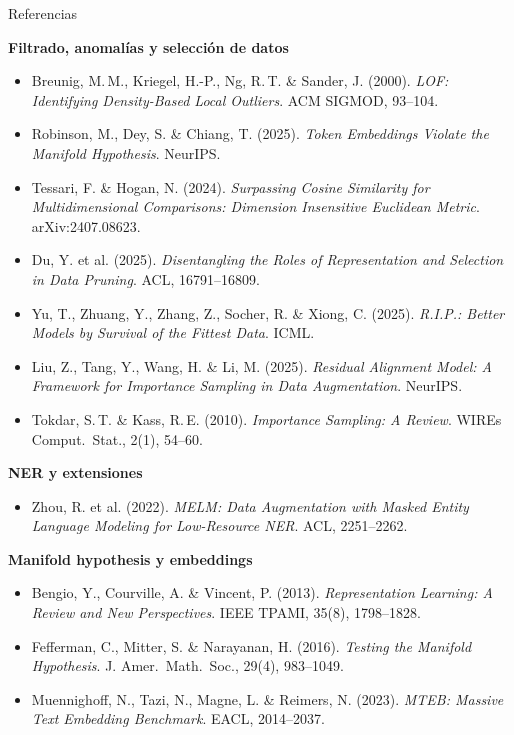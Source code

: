 \begin{frame}[allowframebreaks]{Referencias}
\framebreak

\textbf{Filtrado, anomalías y selección de datos}
\begin{itemize}\setlength\itemsep{0pt}
  \item Breunig, M.\,M., Kriegel, H.-P., Ng, R.\,T. \& Sander, J. (2000). \textit{LOF: Identifying Density-Based Local Outliers}. ACM SIGMOD, 93--104.
  \item Robinson, M., Dey, S. \& Chiang, T. (2025). \textit{Token Embeddings Violate the Manifold Hypothesis}. NeurIPS.
  \item Tessari, F. \& Hogan, N. (2024). \textit{Surpassing Cosine Similarity for Multidimensional Comparisons: Dimension Insensitive Euclidean Metric}. arXiv:2407.08623.
  \item Du, Y. et al. (2025). \textit{Disentangling the Roles of Representation and Selection in Data Pruning}. ACL, 16791--16809.
  \item Yu, T., Zhuang, Y., Zhang, Z., Socher, R. \& Xiong, C. (2025). \textit{R.I.P.: Better Models by Survival of the Fittest Data}. ICML.
  \item Liu, Z., Tang, Y., Wang, H. \& Li, M. (2025). \textit{Residual Alignment Model: A Framework for Importance Sampling in Data Augmentation}. NeurIPS.
  \item Tokdar, S.\,T. \& Kass, R.\,E. (2010). \textit{Importance Sampling: A Review}. WIREs Comput.\ Stat., 2(1), 54--60.
\end{itemize}

\textbf{NER y extensiones}
\begin{itemize}\setlength\itemsep{0pt}
  \item Zhou, R. et al. (2022). \textit{MELM: Data Augmentation with Masked Entity Language Modeling for Low-Resource NER}. ACL, 2251--2262.
\end{itemize}

\textbf{Manifold hypothesis y embeddings}
\begin{itemize}\setlength\itemsep{0pt}
  \item Bengio, Y., Courville, A. \& Vincent, P. (2013). \textit{Representation Learning: A Review and New Perspectives}. IEEE TPAMI, 35(8), 1798--1828.
  \item Fefferman, C., Mitter, S. \& Narayanan, H. (2016). \textit{Testing the Manifold Hypothesis}. J. Amer.\ Math.\ Soc., 29(4), 983--1049.
  \item Muennighoff, N., Tazi, N., Magne, L. \& Reimers, N. (2023). \textit{MTEB: Massive Text Embedding Benchmark}. EACL, 2014--2037.
\end{itemize}
\end{frame}
